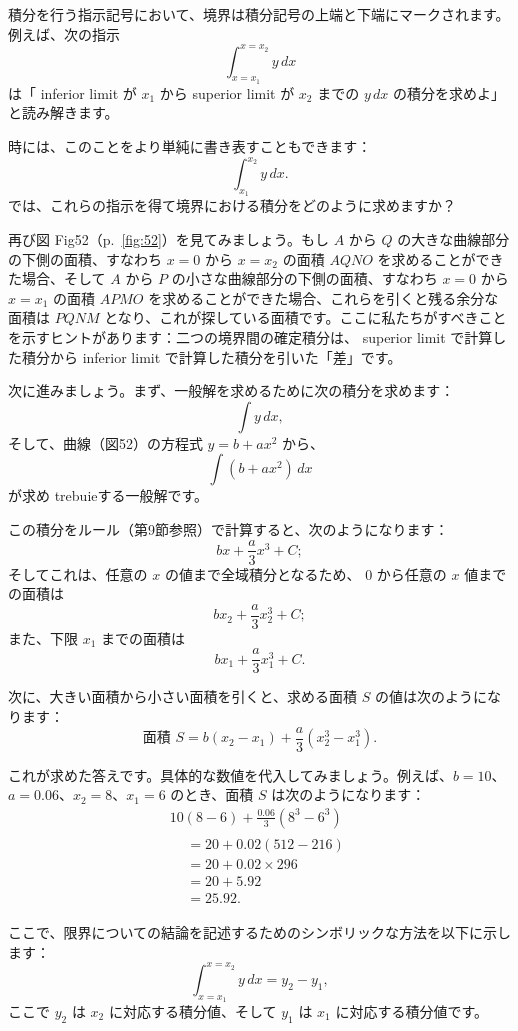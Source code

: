 \documentclass[a4paper,11pt,openany]{ltjsbook}
\newcommand{\Pageref}[2][p.]{#1~\ref{#2}}
\begin{document}
積分を行う指示記号において、境界は積分記号の上端と下端にマークされます。例えば、次の指示
\[
\int_{x=x_1}^{x=x_2} y \, dx
\]
は「 inferior limit が \( x_1 \) から superior limit が \( x_2 \) までの \( y \, dx \) の積分を求めよ」と読み解きます。

時には、このことをより単純に書き表すこともできます：
\[
\int_{x_1}^{x_2} y \, dx.
\]
では、これらの指示を得て境界における積分をどのように求めますか？

再び図 Fig{52}（\Pageref{fig:52}）を見てみましょう。もし \( A \) から \( Q \) の大きな曲線部分の下側の面積、すなわち \( x = 0 \) から \( x = x_2 \) の面積 \( AQNO \) を求めることができた場合、そして \( A \) から \( P \) の小さな曲線部分の下側の面積、すなわち \( x = 0 \) から \( x = x_1 \) の面積 \( APMO \) を求めることができた場合、これらを引くと残る余分な面積は \( PQNM \) となり、これが探している面積です。ここに私たちがすべきことを示すヒントがあります：二つの境界間の確定積分は、 superior limit で計算した積分から inferior limit で計算した積分を引いた「差」です。

次に進みましょう。まず、一般解を求めるために次の積分を求めます：
\[
\int y\, dx,
\]
そして、曲線（図52）の方程式 \(y = b + ax^2\) から、
\[
\int (b + ax^2)\, dx
\]
が求め trebuieする一般解です。

この積分をルール（第9節参照）で計算すると、次のようになります：
\[
bx + \frac{a}{3} x^3 + C;
\]
そしてこれは、任意の \(x\) の値まで全域積分となるため、
\(0\) から任意の \(x\) 値までの面積は
\[
bx_2 + \frac{a}{3} x_2^3 + C;
\]
また、下限 \(x_1\) までの面積は
\[
bx_1 + \frac{a}{3} x_1^3 + C.
\]

次に、大きい面積から小さい面積を引くと、求める面積 \(S\) の値は次のようになります：
\[
\text{面積~$S$} = b(x_2 - x_1) + \frac{a}{3}(x_2^3 - x_1^3).
\]

これが求めた答えです。具体的な数値を代入してみましょう。例えば、\(b = 10\)、\(a = 0.06\)、\(x_2 = 8\)、\(x_1 = 6\) のとき、面積 \(S\) は次のようになります：
\begin{gather*}
10(8 - 6) + \frac{0.06}{3} (8^3 - 6^3) \\
\begin{aligned}
&= 20 + 0.02(512 - 216)    \\
&= 20 + 0.02 \times  296    \\
&= 20 + 5.92     \\
&= 25.92.
\end{aligned}
\end{gather*}

ここで、限界についての結論を記述するためのシンボリックな方法を以下に示します：
\[
\int^{x=x_2}_{x=x_1} y\, dx = y_2 - y_1,
\]
ここで \(y_2\) は \(x_2\) に対応する積分値、そして \(y_1\) は \(x_1\) に対応する積分値です。
\end{document}
